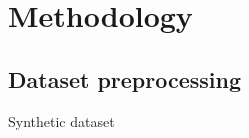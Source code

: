 \section{Methodology}
\subsection{Dataset preprocessing}
Synthetic dataset~\cite{kudela_pawel_2021_5414555}